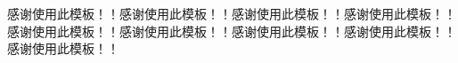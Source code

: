 \vspace*{12pt}
\centerline{\songti \textbf{}}
\vspace*{12pt}
感谢使用此模板！！感谢使用此模板！！感谢使用此模板！！感谢使用此模板！！感谢使用此模板！！感谢使用此模板！！感谢使用此模板！！感谢使用此模板！！感谢使用此模板！！

